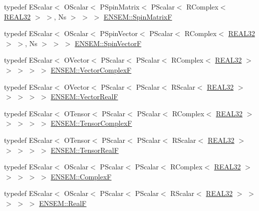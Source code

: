 \begin{DoxyCompactItemize}
\item 
typedef E\+Scalar$<$ O\+Scalar$<$ P\+Spin\+Matrix$<$ P\+Scalar$<$ R\+Complex$<$ \mbox{\hyperlink{adat-devel_2lib_2ensem_2ensem__precision_8h_aba070372e01b28d5afdf9257e8e4390c}{R\+E\+A\+L32}} $>$ $>$, Ns $>$ $>$ $>$ \mbox{\hyperlink{group__defs_ga9332913187b2b1a824c75f7c9cafd4d3}{E\+N\+S\+E\+M\+::\+Spin\+MatrixF}}
\item 
typedef E\+Scalar$<$ O\+Scalar$<$ P\+Spin\+Vector$<$ P\+Scalar$<$ R\+Complex$<$ \mbox{\hyperlink{adat-devel_2lib_2ensem_2ensem__precision_8h_aba070372e01b28d5afdf9257e8e4390c}{R\+E\+A\+L32}} $>$ $>$, Ns $>$ $>$ $>$ \mbox{\hyperlink{group__defs_gac8b2551d6b9e8c0baa2f4261f966b28a}{E\+N\+S\+E\+M\+::\+Spin\+VectorF}}
\item 
typedef E\+Scalar$<$ O\+Vector$<$ P\+Scalar$<$ P\+Scalar$<$ R\+Complex$<$ \mbox{\hyperlink{adat-devel_2lib_2ensem_2ensem__precision_8h_aba070372e01b28d5afdf9257e8e4390c}{R\+E\+A\+L32}} $>$ $>$ $>$ $>$ $>$ \mbox{\hyperlink{group__defs_ga6a0a527d27235e5a8e8f28342eb7676f}{E\+N\+S\+E\+M\+::\+Vector\+ComplexF}}
\item 
typedef E\+Scalar$<$ O\+Vector$<$ P\+Scalar$<$ P\+Scalar$<$ R\+Scalar$<$ \mbox{\hyperlink{adat-devel_2lib_2ensem_2ensem__precision_8h_aba070372e01b28d5afdf9257e8e4390c}{R\+E\+A\+L32}} $>$ $>$ $>$ $>$ $>$ \mbox{\hyperlink{group__defs_gaa81b1a62c5846ad0db2fe60ff8f1e1b3}{E\+N\+S\+E\+M\+::\+Vector\+RealF}}
\item 
typedef E\+Scalar$<$ O\+Tensor$<$ P\+Scalar$<$ P\+Scalar$<$ R\+Complex$<$ \mbox{\hyperlink{adat-devel_2lib_2ensem_2ensem__precision_8h_aba070372e01b28d5afdf9257e8e4390c}{R\+E\+A\+L32}} $>$ $>$ $>$ $>$ $>$ \mbox{\hyperlink{group__defs_ga7bcf210bf1e9c23606254944d97046d0}{E\+N\+S\+E\+M\+::\+Tensor\+ComplexF}}
\item 
typedef E\+Scalar$<$ O\+Tensor$<$ P\+Scalar$<$ P\+Scalar$<$ R\+Scalar$<$ \mbox{\hyperlink{adat-devel_2lib_2ensem_2ensem__precision_8h_aba070372e01b28d5afdf9257e8e4390c}{R\+E\+A\+L32}} $>$ $>$ $>$ $>$ $>$ \mbox{\hyperlink{group__defs_ga36a49616408973774f501cbb3964c160}{E\+N\+S\+E\+M\+::\+Tensor\+RealF}}
\item 
typedef E\+Scalar$<$ O\+Scalar$<$ P\+Scalar$<$ P\+Scalar$<$ R\+Complex$<$ \mbox{\hyperlink{adat-devel_2lib_2ensem_2ensem__precision_8h_aba070372e01b28d5afdf9257e8e4390c}{R\+E\+A\+L32}} $>$ $>$ $>$ $>$ $>$ \mbox{\hyperlink{group__defs_ga9d343936e63ca257d34c7e2198e549d7}{E\+N\+S\+E\+M\+::\+ComplexF}}
\item 
typedef E\+Scalar$<$ O\+Scalar$<$ P\+Scalar$<$ P\+Scalar$<$ R\+Scalar$<$ \mbox{\hyperlink{adat-devel_2lib_2ensem_2ensem__precision_8h_aba070372e01b28d5afdf9257e8e4390c}{R\+E\+A\+L32}} $>$ $>$ $>$ $>$ $>$ \mbox{\hyperlink{group__defs_gaaff7cc896fceee5b1ea6ba88497469ab}{E\+N\+S\+E\+M\+::\+RealF}}

\end{DoxyCompactItemize}
